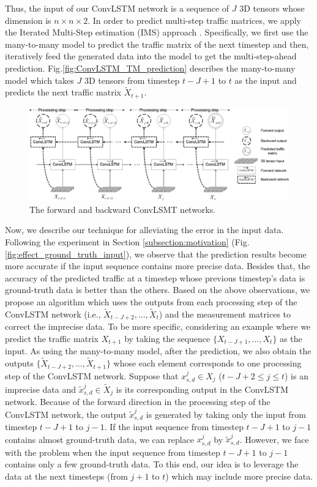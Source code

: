 Thus, the input of our ConvLSTM network is a sequence of $J$ 3D tensors whose dimension is $n \times n \times 2$. 
In order to predict multi-step traffic matrices, we apply the Iterated Multi-Step estimation (IMS) approach \cite{shi2018machine}. Specifically, we first use the many-to-many model to predict the traffic matrix of the next timestep and then, iteratively feed the generated data into the model to get the multi-step-ahead prediction. Fig.\ref{fig:ConvLSTM_TM_prediction} describes the many-to-many model which takes $J$ 3D tensors from timestep $t-J+1$ to $t$ as the input and predicts the next traffic matrix $\widetilde{X}_{t+1}$. 
\begin{figure}[bt]
\centering
\includegraphics[width=0.65\columnwidth]{proposed_model_figs/forward_backward_model.eps}
		\caption{The forward and backward ConvLSMT networks. \label{fig:forward_backward_model}}
\end{figure}

Now, we describe our technique for alleviating the error in the input data. Following the experiment in Section \ref{subsection:motivation} (Fig.\ref{fig:effect_ground_truth_input}), we observe that the prediction results become more accurate if the input sequence contains more precise data. Besides that, the accuracy of the predicted traffic at a timestep whose previous timestep's data is ground-truth data is better than the others. Based on the above observations, we propose an algorithm which uses the outputs from each processing step of the ConvLSTM network (i.e., $\widetilde{X}_{t-J+2},...,\widetilde{X}_{t}$) and the measurement matrices to correct the imprecise data. To be more specific, considering an example where we predict the traffic matrix $X_{t+1}$ by taking the sequence $\{X_{t-J+1},...,X_t\}$ as the input. As using the many-to-many model, after the prediction, we also obtain the outputs $\{\widetilde{X}_{t-J+2},...,\widetilde{X}_{t+1}\}$ whose each element corresponds to one processing step of the ConvLSTM network. Suppose that $x_{s,d}^j \in X_j$ ($t-J+2 \leq j \leq t$) is an imprecise data and $\widetilde{x}^j_{s,d} \in \widetilde{X}_{j}$ is its corresponding output in the ConvLSTM network. Because of the forward direction in the processing step of the ConvLSTM network, the output $\widetilde{x}^j_{s,d}$ is generated by taking only the input from timestep $t-J+1$ to $j-1$. If the input sequence from timestep $t-J+1$ to $j-1$ contains almost ground-truth data, we can replace $x_{s,d}^j$ by $\widetilde{x}^j_{s,d}$. However, we face with the problem when the input sequence from timestep $t-J+1$ to $j-1$ contains only a few ground-truth data. To this end, our idea is to leverage the data at the next timesteps (from $j+1$ to $t$) which may include more precise data.

